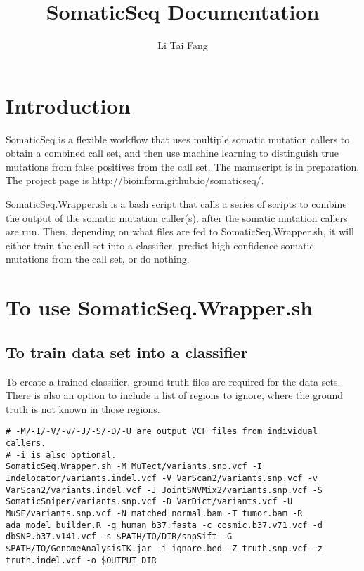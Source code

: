 \documentclass[10pt,letterpaper]{article}
\author{Li Tai Fang}
\title{SomaticSeq Documentation}
\begin{document}
\maketitle



\begin{sloppypar}




\section{Introduction}

SomaticSeq is a flexible workflow that uses multiple somatic mutation callers to obtain a combined call set, and then use machine learning to distinguish true mutations from false positives from the call set. The manuscript is in preparation. The project page is \href{http://bioinform.github.io/somaticseq/}{http://bioinform.github.io/somaticseq/}. 

SomaticSeq.Wrapper.sh is a bash script that calls a series of scripts to combine the output of the somatic mutation caller(s), after the somatic mutation callers are run. Then, depending on what files are fed to SomaticSeq.Wrapper.sh, it will either train the call set into a classifier, predict high-confidence somatic mutations from the call set, or do nothing. 



\section{To use SomaticSeq.Wrapper.sh}

\subsection{To train data set into a classifier}

To create a trained classifier, ground truth files are required for the data sets. There is also an option to include a list of regions to ignore, where the ground truth is not known in those regions. 

\begin{lstlisting}
# -M/-I/-V/-v/-J/-S/-D/-U are output VCF files from individual callers.
# -i is also optional.
SomaticSeq.Wrapper.sh -M MuTect/variants.snp.vcf -I Indelocator/variants.indel.vcf -V VarScan2/variants.snp.vcf -v VarScan2/variants.indel.vcf -J JointSNVMix2/variants.snp.vcf -S SomaticSniper/variants.snp.vcf -D VarDict/variants.vcf -U MuSE/variants.snp.vcf -N matched_normal.bam -T tumor.bam -R ada_model_builder.R -g human_b37.fasta -c cosmic.b37.v71.vcf -d dbSNP.b37.v141.vcf -s $PATH/TO/DIR/snpSift -G $PATH/TO/GenomeAnalysisTK.jar -i ignore.bed -Z truth.snp.vcf -z truth.indel.vcf -o $OUTPUT_DIR
\end{lstlisting}


\end{sloppypar}
\end{document}
